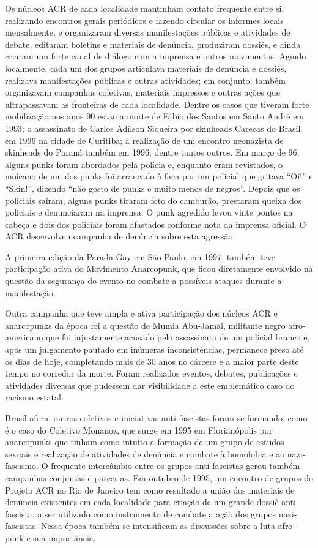 Os núcleos ACR de cada localidade mantinham contato frequente entre si, realizando encontros gerais periódicos e fazendo circular os informes locais mensalmente, e organizaram diversas manifestações públicas e atividades de debate, editaram boletins e materiais de denúncia, produziram dossiês, e ainda criaram um forte canal de diálogo com a imprensa e outros movimentos. Agindo localmente, cada um dos grupos articulava materiais de denúncia e dossiês, realizava manifestações públicas e outras atividades; em conjunto, também organizavam campanhas coletivas, materiais impressos e outras ações que ultrapassavam as fronteiras de cada localidade. Dentre os casos que tiveram forte mobilização nos anos 90 estão a morte de Fábio dos Santos em Santo André em 1993; o assassinato de Carlos Adilson Siqueira por skinheads Carecas do Brasil em 1996 na cidade de Curitiba; a realização de um encontro neonazista de skinheads do Paraná também em 1996; dentre tantos outros. Em março de 96, alguns punks foram abordados pela polícia e, enquanto eram revistados, o moicano de um dos punks foi arrancado à faca por um policial que gritava “Oi!” e “Skin!”, dizendo “não gosto de punks e muito menos de negros”. Depois que os policiais saíram, alguns punks tiraram foto do camburão, prestaram queixa dos policiais e denunciaram na imprensa. O punk agredido levou vinte pontos na cabeça e dois dos policiais foram afastados conforme nota da imprensa oficial. O ACR desenvolveu campanha de denúncia sobre esta agressão.

A primeira edição da Parada Gay em São Paulo, em 1997, também teve participação ativa do Movimento Anarcopunk, que ficou diretamente envolvido na questão da segurança do evento no combate a possíveis ataques durante a manifestação.

Outra campanha que teve ampla e ativa participação dos núcleos ACR e anarcopunks da época foi a questão de Mumia Abu-Jamal, militante negro afro-americano que foi injustamente acusado pelo assassinato de um policial branco e, após um julgamento pautado em inúmeras inconsistências, permanece preso até os dias de hoje, completando mais de 30 anos no cárcere e a maior parte deste tempo no corredor da morte. Foram realizados eventos, debates, publicações e atividades diversas que pudessem dar visibilidade a este emblemático caso do racismo estatal.

Brasil afora, outros coletivos e iniciativas anti-fascistas foram se formando, como é o caso do Coletivo Monanoz, que surge em 1995 em Florianópolis por anarcopunks que tinham como intuito a formação de um grupo de estudos sexuais e realização de atividades de denúncia e combate à homofobia e ao nazi-fascismo. O frequente intercâmbio entre os grupos anti-fascistas gerou também campanhas conjuntas e parcerias. Em outubro de 1995, um encontro de grupos do Projeto ACR no Rio de Janeiro tem como resultado a união dos materiais de denúncia existentes em cada localidade para criação de um grande dossiê anti-fascista, a ser utilizado como instrumento de combate a ação dos grupos nazi-fascistas. Nessa época também se intensificam as discussões sobre a luta afro-punk e sua importância.

